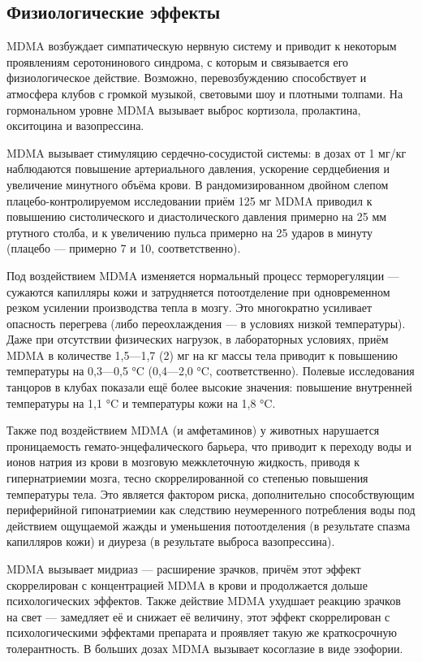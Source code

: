 \documentclass[a4paper,14pt,russian]{report}
\begin{document}
\subsection{Физиологические эффекты}

MDMA возбуждает симпатическую нервную систему и приводит к некоторым проявлениям серотонинового синдрома, с которым и связывается его физиологическое действие. Возможно, перевозбуждению способствует и атмосфера клубов с громкой музыкой, световыми шоу и плотными толпами. На гормональном уровне MDMA вызывает выброс кортизола, пролактина, окситоцина и вазопрессина.

MDMA вызывает стимуляцию сердечно-сосудистой системы: в дозах от 1 мг/кг наблюдаются повышение артериального давления, ускорение сердцебиения и увеличение минутного объёма крови. В рандомизированном двойном слепом плацебо-контролируемом исследовании приём 125 мг MDMA приводил к повышению систолического и диастолического давления примерно на 25 мм ртутного столба, и к увеличению пульса примерно на 25 ударов в минуту (плацебо — примерно 7 и 10, соответственно).

Под воздействием MDMA изменяется нормальный процесс терморегуляции — сужаются капилляры кожи и затрудняется потоотделение при одновременном резком усилении производства тепла в мозгу. Это многократно усиливает опасность перегрева (либо переохлаждения — в условиях низкой температуры). Даже при отсутствии физических нагрузок, в лабораторных условиях, приём MDMA в количестве 1,5—1,7 (2) мг на кг массы тела приводит к повышению температуры на 0,3—0,5 °C (0,4—2,0 °C, соответственно). Полевые исследования танцоров в клубах показали ещё более высокие значения: повышение внутренней температуры на 1,1 °C и температуры кожи на 1,8 °C.

Также под воздействием MDMA (и амфетаминов) у животных нарушается проницаемость гемато-энцефалического барьера, что приводит к переходу воды и ионов натрия из крови в мозговую межклеточную жидкость, приводя к гипернатриемии мозга, тесно скоррелированной со степенью повышения температуры тела. Это является фактором риска, дополнительно способствующим периферийной гипонатриемии как следствию неумеренного потребления воды под действием ощущаемой жажды и уменьшения потоотделения (в результате спазма капилляров кожи) и диуреза (в результате выброса вазопрессина).

MDMA вызывает мидриаз — расширение зрачков, причём этот эффект скоррелирован с концентрацией MDMA в крови и продолжается дольше психологических эффектов. Также действие MDMA ухудшает реакцию зрачков на свет — замедляет её и снижает её величину, этот эффект скоррелирован с психологическими эффектами препарата и проявляет такую же краткосрочную толерантность. В больших дозах MDMA вызывает косоглазие в виде эзофории.
\end{document}

